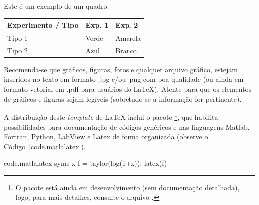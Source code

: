 \begin{quadro}[ht!]
  \centering {} \setlength\aboverulesep{0pt} \setlength\belowrulesep{0pt}
  \caption{Este é um exemplo de um quadro.}
    \fontsize{11}{12}\selectfont 
    \begin{tabular}{| C{2.8cm} | C{1.8cm} | C{1.8cm} |}
    \hline
    \textbf{ Experimento / Tipo } & \textbf{Exp. 1} & \textbf{Exp. 2}\\
	\midrule
		Tipo 1& Verde & Amarela\\
		 Tipo 2 & Azul & Branco\\
	\hline
    \end{tabular}
    \label{quad.exemplo}%
    \vspace{2mm}
\end{quadro}%



Recomenda-se que gráficos, figuras, fotos e qualquer arquivo gráfico, estejam inseridos no texto em formato .jpg e/ou .png com boa qualidade (ou ainda em formato vetorial em .pdf para usuários do \LaTeX\xspace). Atente para que os elementos de gráficos e figuras sejam legíveis (sobretudo se a informação for pertinente).


A distribuição deste \textit{template} de \LaTeX\xspace inclui o pacote \footnote{O pacote está ainda em desenvolvimento (sem documentação detalhada), logo, para mais detalhes, consulte o arquivo .}, que habilita possibilidades para documentação de códigos genéricos e nas linguagens Matlab, Fortran, Python, LabView e Latex de forma organizada (observe o Código~\ref{code.matlalatex}).

\clearpage
\begin{matlabcode}{code.matlalatex}
  syms x
  f = taylor(log(1+x));
  latex(f)
\end{matlabcode}

